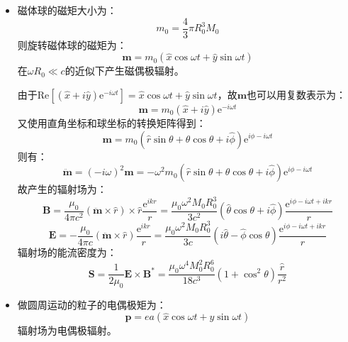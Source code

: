 \documentclass[a4paper,fontset=none]{ctexart}
\begin{document}
\begin{itemize}
        \[
            \nabla \cdot \bm{A}(\bm{x}, t) = \frac{\mu_0}{4\pi} \iiint \left[\frac{1}{r} \nabla' \cdot \bm{J}(\bm{x}')\right]\,\mathrm{d}V'
        \]
        另一方面，对于静电势$\varphi$：
        \[
            \frac{\partial\varphi(\bm{x}, t)}{\partial t} = \frac{1}{4\pi\varepsilon_0} \iiint \frac{1}{r}\frac{\partial\rho(\bm{x'}, t')}{\partial t'}\,\mathrm{d}V'
        \]
        故由电荷守恒定律：
        \[
            \nabla' \cdot \bm{J}(\bm{x}', t') + \frac{\partial\rho(\bm{x'}, t')}{\partial t'} = 0
        \]
        得：
        \[
            \nabla \cdot \bm{A}(\bm{x}, t) + \frac{1}{c^2}\frac{\partial\varphi(\bm{x}, t)}{\partial t} = 0
        \]
        即$\bm{A}$和$\varphi$满足Lorenz规范。

        \item[10.]
        磁体球的磁矩大小为：
        \[
            m_0 = \frac{4}{3}\pi R_0^3M_0
        \]
        则旋转磁体球的磁矩为：
        \[
            \bm{m} = m_0(\hat{x}\cos\omega t + \hat{y}\sin\omega t)
        \]
        在$\omega R_0\ll c$的近似下产生磁偶极辐射。

        由于$\mathrm{Re}\left[(\hat{x} + i\hat{y})\mathrm{e}^{-i\omega t}\right]=\hat{x}\cos\omega t + \hat{y}\sin\omega t$，故$\bm{m}$也可以用复数表示为：
        \[
            \bm{m} = m_0(\hat{x} + i\hat{y})\mathrm{e}^{-i\omega t}
        \]
        又使用直角坐标和球坐标的转换矩阵得到：
        \[
            \bm{m} = m_0(\hat{r}\sin\theta + \theta\cos\theta + i\hat{\phi})\mathrm{e}^{i\phi-i\omega t}
        \]
        则有：
        \[
            \ddot{\bm{m}} = (-i\omega)^2\bm{m} = -\omega^2m_0(\hat{r}\sin\theta + \theta\cos\theta + i\hat{\phi})\mathrm{e}^{i\phi-i\omega t}
        \]
        故产生的辐射场为：
        \[
            \bm{B} = \frac{\mu_0}{4\pi c^2}(\ddot{\bm{m}} \times \hat{r}) \times \hat{r} \frac{\mathrm{e}^{ikr}}{r} = \frac{\mu_0\omega^2M_0R_0^3}{3c^2}(\hat{\theta}\cos\theta + i\hat{\phi})\frac{\mathrm{e}^{i\phi-i\omega t+ikr}}{r}
        \]
        \[
            \bm{E} = -\frac{\mu_0}{4\pi c}(\ddot{\bm{m}} \times \hat{r}) \frac{\mathrm{e}^{ikr}}{r} = \frac{\mu_0\omega^2M_0R_0^3}{3c}(i\hat{\theta} - \hat{\phi}\cos\theta)\frac{\mathrm{e}^{i\phi-i\omega t+ikr}}{r}
        \]
        辐射场的能流密度为：
        \[
            \bm{S} = \frac{1}{2\mu_0}\bm{E} \times \bm{B}^* = \frac{\mu_0\omega^4M_0^2R_0^6}{18c^3}(1 + \cos^2\theta)\frac{\hat{r}}{r^2}
        \]

        \item[11.]
        做圆周运动的粒子的电偶极矩为：
        \[
            \bm{p} = ea(\hat{x}\cos\omega t + \hat{y}\sin\omega t)
        \]
        辐射场为电偶极辐射。


\end{itemize}
\end{document}
